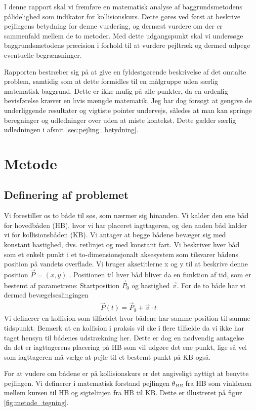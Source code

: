 \documentclass[%
 reprint,
nofootinbib,
aps,
]{revtex4-1}
\begin{document}
I denne rapport skal vi fremføre en matematisk analyse af baggrundsmetodens pålidelighed som indikator for kollisionskurs. Dette gøres ved først at beskrive pejlingens betydning for denne vurdering, og dernæst vurdere om der er sammenfald mellem de to metoder. Med dette udgangspunkt skal vi undersøge baggrundsmetodens præcision i forhold til at vurdere pejltræk og dermed udpege eventuelle begrænsninger.\par
Rapporten bestræber sig på at give en fyldestgørende beskrivelse af det omtalte problem, samtidig som at dette formidles til en målgruppe uden særlig matematisk baggrund. Dette er ikke mulig på alle punkter, da en ordenlig bevisførelse kræver en hvis mængde matematik. Jeg har dog forsøgt at gengive de underliggende resultater og vigtiste pointer undervejs, således at man kan springe beregninger og udledninger over uden at miste kontekst. Dette gælder særlig udledningen i afsnit \ref{sec:pejling_betydning}.


\section{Metode}
\subsection{Definering af problemet}
Vi forestiller os to både til søs, som nærmer sig hinanden. Vi kalder den ene båd for hovedbåden (HB), hvor vi har placeret iagttageren, og den anden båd kalder vi for kollisionsbåden (KB). Vi antager at begge bådene bevæger sig med konstant hastighed, dvs. retlinjet og med konstant fart. Vi beskriver hver båd som et enkelt punkt i et to-dimensionsjonalt aksesystem som tilsvarer bådens position på vandets overflade. Vi bruger aksetitlerne x og y til at beskrive denne position $\vec{P} = (x, y)$ . Positionen til hver båd bliver da en funktion af tid, som er bestemt af parametrene: Startposition $\vec{P}_0$ og hastighed $\vec{v}$. For de to både har vi dermed bevægelseslingingen
\begin{align}
  \vec{P}(t) =  \vec{P}_0 + \vec{v}\cdot t
  \label{eq:motion}
\end{align}
Vi definerer en kollision som tilfældet hvor bådene har samme position til samme tidspunkt. Bemærk at en kollision i praksis vil ske i flere tilfælde da vi ikke har taget hensyn til bådenes udstrækning her. Dette er dog en nødvendig antagelse da det er iagttagerens placering på HB som vil udgøre det ene punkt, lige så vel som iagttageren må vælge at pejle til et bestemt punkt på KB også. \par
For at vudere om bådene er på kollisionskurs er det angiveligt nyttigt at benytte pejlingen. Vi definerer i matematisk forstand pejlingen $\theta_{HB}$ fra HB som vinklenen mellem kursen til HB og sigtelinjen fra HB til KB. Dette er illustreret på figur \ref{fig:metode_tegning}.
\end{document}
